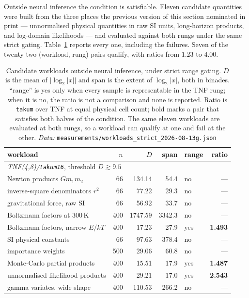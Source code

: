 \documentclass[11pt]{article}
\theoremstyle{definition}
\begin{document}
Outside neural inference the condition is satisfiable. Eleven candidate
quantities were built from the three places the previous version of this section
nominated in print --- unnormalised physical quantities in raw SI units,
long-horizon products, and log-domain likelihoods --- and evaluated against both
rungs under the same strict gating. Table~\ref{tab:workloads} reports every one,
including the failures. Seven of the twenty-two (workload, rung) pairs qualify,
with ratios from $1.23$ to $4.00$.

\begin{table}[htbp]\centering
\caption{Candidate workloads outside neural inference, under strict range gating.
$D$ is the mean of $\lvert \log_2|x| \rvert$ and span is the extent of
$\log_2|x|$, both in binades. ``range'' is yes only when every sample is
representable in the TNF rung; when it is no, the ratio is not a comparison and none is
reported. Ratio is \texttt{takum} over TNF at equal physical cell count; bold
marks a pair that satisfies both halves of the condition. The same eleven
workloads are evaluated at both rungs, so a workload can qualify at one and fail
at the other. \emph{Data:} \texttt{measurements/workloads\_strict\_2026-08-13g.json}}
\label{tab:workloads}
\begin{tabular}{lrrrlr}
\hline
workload & $n$ & $D$ & span & range & ratio \\
\hline
\multicolumn{6}{l}{\emph{TNF(4,8)/\texttt{takum16}}, threshold $D \gtrsim 9.5$}\\
\hline
Newton products $Gm_1m_2$ & 66 & 134.14 & 54.4 & no & --- \\
inverse-square denominators $r^2$ & 66 & 77.22 & 29.3 & no & --- \\
gravitational force, raw SI & 66 & 56.92 & 33.7 & no & --- \\
Boltzmann factors at $300$\,K & 400 & 1747.59 & 3342.3 & no & --- \\
Boltzmann factors, narrow $E/kT$ & 400 & 17.23 & 27.9 & yes & \textbf{1.493} \\
SI physical constants & 66 & 97.63 & 378.4 & no & --- \\
importance weights & 500 & 29.06 & 60.8 & no & --- \\
Monte-Carlo partial products & 400 & 15.51 & 17.9 & yes & \textbf{1.487} \\
unnormalised likelihood products & 400 & 29.21 & 17.0 & yes & \textbf{2.543} \\
gamma variates, wide shape & 400 & 110.53 & 266.2 & no & --- \\

\end{tabular}
\end{table}
\end{document}
